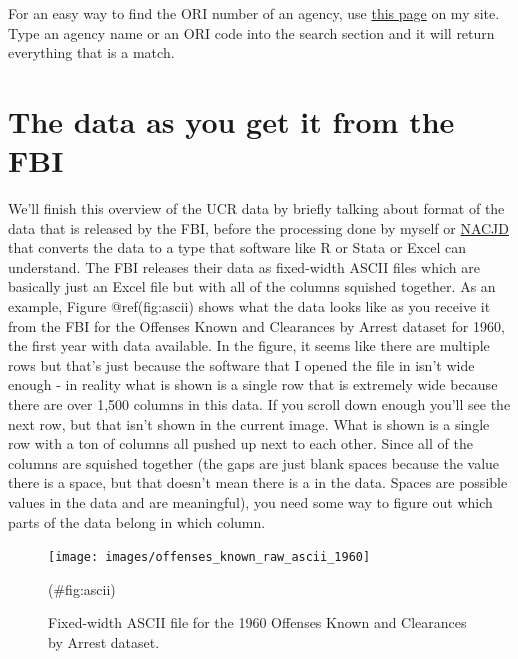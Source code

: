 \documentclass[
  12pt,
  openany]{book}
\begin{document}
For an easy way to find the ORI number of an agency, use \href{https://jacobdkaplan.com/crosswalk.html}{this page} on my site. Type an agency name or an ORI code into the search section and it will return everything that is a match.

\hypertarget{the-data-as-you-get-it-from-the-fbi}{%
\section{The data as you get it from the FBI}\label{the-data-as-you-get-it-from-the-fbi}}

We'll finish this overview of the UCR data by briefly talking about format of the data that is released by the FBI, before the processing done by myself or \href{https://www.icpsr.umich.edu/web/pages/NACJD/index.html}{NACJD} that converts the data to a type that software like R or Stata or Excel can understand. The FBI releases their data as fixed-width ASCII files which are basically just an Excel file but with all of the columns squished together. As an example, Figure @ref(fig:ascii) shows what the data looks like as you receive it from the FBI for the Offenses Known and Clearances by Arrest dataset for 1960, the first year with data available. In the figure, it seems like there are multiple rows but that's just because the software that I opened the file in isn't wide enough - in reality what is shown is a single row that is extremely wide because there are over 1,500 columns in this data. If you scroll down enough you'll see the next row, but that isn't shown in the current image. What is shown is a single row with a ton of columns all pushed up next to each other. Since all of the columns are squished together (the gaps are just blank spaces because the value there is a space, but that doesn't mean there is a in the data. Spaces are possible values in the data and are meaningful), you need some way to figure out which parts of the data belong in which column.

\begin{figure}

{\centering \texttt{[image: images/offenses\_known\_raw\_ascii\_1960]} 

}

\caption{Fixed-width ASCII file for the 1960 Offenses Known and Clearances by Arrest dataset.}(\#fig:ascii)
\end{figure}
\end{document}
